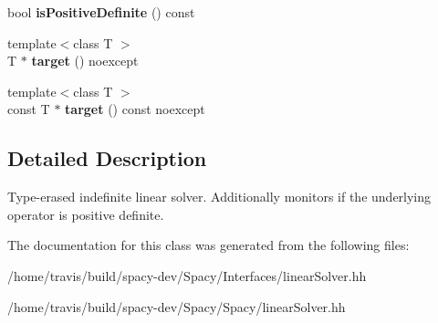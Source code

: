 \begin{DoxyCompactItemize}
\item 
\hypertarget{classSpacy_1_1IndefiniteLinearSolver_a04191e6ed2c8cd54870c79a919dcae39}{bool {\bfseries is\-Positive\-Definite} () const }\label{classSpacy_1_1IndefiniteLinearSolver_a04191e6ed2c8cd54870c79a919dcae39}

\item 
\hypertarget{classSpacy_1_1IndefiniteLinearSolver_a6c0daed405c2671c8957848d731c0a1f}{{\footnotesize template$<$class T $>$ }\\\-T $\ast$ {\bfseries target} () noexcept}\label{classSpacy_1_1IndefiniteLinearSolver_a6c0daed405c2671c8957848d731c0a1f}

\item 
\hypertarget{classSpacy_1_1IndefiniteLinearSolver_a82c21063fa0c4b354d3e86db26ef125a}{{\footnotesize template$<$class T $>$ }\\const \-T $\ast$ {\bfseries target} () const noexcept}\label{classSpacy_1_1IndefiniteLinearSolver_a82c21063fa0c4b354d3e86db26ef125a}

\end{DoxyCompactItemize}


\subsection{\-Detailed \-Description}
\-Type-\/erased indefinite linear solver. \-Additionally monitors if the underlying operator is positive definite. 

\-The documentation for this class was generated from the following files\-:\begin{DoxyCompactItemize}
\item 
/home/travis/build/spacy-\/dev/\-Spacy/\-Interfaces/linear\-Solver.\-hh\item 
/home/travis/build/spacy-\/dev/\-Spacy/\-Spacy/linear\-Solver.\-hh\end{DoxyCompactItemize}

